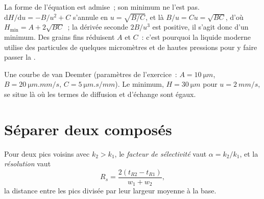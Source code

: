 \admitted

La forme de l'équation est admise~; son minimum ne l'est pas. $\mathrm dH/\mathrm du = -B/u^2 + C$ s'annule
en $u = \sqrt{B/C}$, et là $B/u = Cu = \sqrt{BC}$, d'où $H_{\min} = A + 2\sqrt{BC}$~; la dérivée seconde
$2B/u^3$ est positive, il s'agit donc d'un minimum. Des grains fins réduisent $A$ et $C$~: c'est pourquoi
la  liquide moderne utilise des particules de quelques micromètres et de hautes pressions
pour y faire passer la .

\begin{omfigure}

{\small Une courbe de van Deemter (paramètres de l'exercice~: $A = \qty{10}{\micro m}$, $B = \qty{20}{\micro m.mm/s}$,
$C = \qty{5}{\micro m.s/mm}$). Le minimum, $H = \qty{30}{\micro m}$ pour $u = \qty{2}{mm/s}$, se situe là où
les termes de diffusion et d'échange sont égaux.}
\end{omfigure}

\section{Séparer deux composés}

\begin{definition}\label{def:b2:chromatography:separation}
Pour deux pics voisins avec $k_2 > k_1$, le \emph{facteur de sélectivité} vaut
$\alpha = k_2/k_1$, et la \emph{résolution} vaut
\begin{equation*}
R_s = \frac{2(t_{R2} - t_{R1})}{w_1 + w_2},
\end{equation*}
la distance entre les pics divisée par leur largeur moyenne à la base.
\end{definition}

